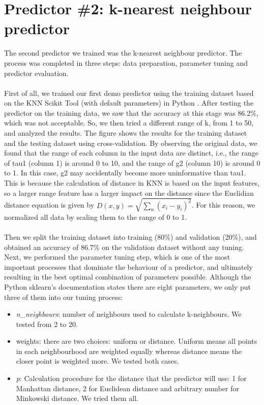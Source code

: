 \documentclass{article}
\newcommand{\enterProblemHeader}[1]{
\nobreak\extramarks{#1}{#1}\nobreak
\nobreak\extramarks{#1}{#1}\nobreak
}
\newcommand{\exitProblemHeader}[1]{
\nobreak\extramarks{#1}{#1}\nobreak
\nobreak\extramarks{#1}{}\nobreak
}
\newcounter{homeworkProblemCounter} %
\newcommand{\homeworkProblemName}{}
\newenvironment{homeworkProblem}[1][Problem \arabic{homeworkProblemCounter}]{ %
\stepcounter{homeworkProblemCounter} %
\renewcommand{\homeworkProblemName}{#1} %
\section{\homeworkProblemName} %
\enterProblemHeader{} %
}{
\exitProblemHeader{} %
}
\begin{document}
\clearpage
\begin{homeworkProblem}[Predictor \#2: k-nearest neighbour predictor]
The second predictor we trained was the k-nearest neighbour predictor. The process was completed in three steps: data preparation, parameter tuning and predictor evaluation.
\\
\\
First of all, we trained our first demo predictor using the training dataset based on the KNN Scikit Tool (with default parameters) in Python \cite{knn}. After testing the predictor on the training data, we saw that the accuracy at this stage was 86.2\%, which was not acceptable. So, we then tried a different range of k, from 1 to 50, and analyzed the results. The figure shows the results for the training dataset and the testing dataset using cross-validation. By observing the original data, we found that the range of each column in the input data are distinct, i.e., the range of tau1
(column 1) is around 0 to 10, and the range of g2 (column 10) is around 0 to 1. In this case, g2 may accidentally become more uninformative than tau1. This is because the calculation of distance in KNN is based on the input features, so a larger range feature has a larger impact on the distance since the Euclidian distance equation is given by $D(x,y) = \sqrt{\sum_n (x_i-y_i)^2}$. For this reason, we normalized all data by scaling them to the range of 0 to 1. 
\\
\\
Then we split the training dataset into training (80\%) and validation (20\%), and obtained an accuracy of 86.7\% on the validation dataset without any tuning. Next, we performed the parameter tuning step, which is one of the most important processes that dominate the behaviour of a predictor, and ultimately resulting in the best optimal combination of parameters possible. Although the Python sklearn’s documentation states there are eight parameters, we only put three of them into our tuning process:
\begin{itemize}
    \item \textit{n\_neighbours}: number of neighbours used to calculate k-neighbours. We tested from 2 to 20.
    \item  weights: there are two choices: uniform or distance. Uniform means all points in each neighbourhood are weighted equally whereas distance means the closer point is weighted more. We tested both cases.
    \item \textit{p}: Calculation procedure for the distance that the predictor will use:  1 for Manhattan distance, 2 for Euclidean distance and arbitrary number for Minkowski distance. We tried them all. 

\end{itemize}
\end{homeworkProblem}
\end{document}
